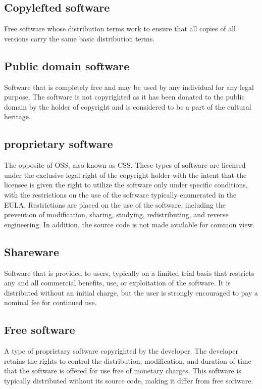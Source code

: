  \subsection*{Copylefted software}
Free software whose distribution terms work to ensure that all copies of all versions carry the same basic distribution terms.
    \subsection*{Public domain software}
    Software that is completely free and may be used by any individual for any legal purpose. The software is not copyrighted as it has been donated to the public domain by the holder of copyright and is considered to be a part of the cultural heritage.
    \subsection*{proprietary software}
    The opposite of OSS, also known as \ac{CSS}. These types of software are licensed under the exclusive legal right of the copyright holder with the intent that the licensee is given the right to utilize the software only under specific conditions, with the restrictions on the use of the software typically enumerated in the  \ac{EULA}. Restrictions are placed on the use of the software, including the prevention of modification, sharing, studying, redistributing, and reverse engineering. In addition, the source code is not made available for common view.
  \subsection*{Shareware}
  Software that is provided to users, typically on a limited trial basis that restricts any and all commercial benefits, use, or exploitation of the software. It is distributed without an initial charge, but the user is strongly encouraged to pay a nominal fee for continued use.   
  \subsection*{Free software}
A type of proprietary software copyrighted by the developer. The developer retains the rights to control the distribution, modification, and duration of time that the software is offered for use free of monetary charges. This software is typically distributed without its source code, making it differ from free software. 
